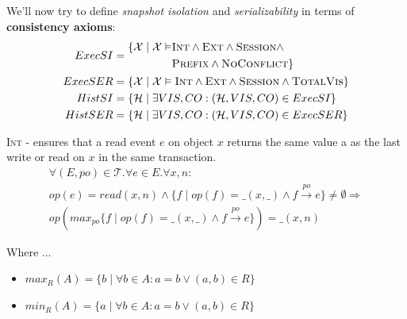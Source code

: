 \documentclass{beamer}
\begin{document}
\begin{frame}
	We'll now try to define \emph{snapshot isolation} and \emph{serializability} in terms of \textbf{consistency axioms}:
	\begin{equation*}
		\begin{aligned}
			ExecSI = {} &
				\begin{aligned} 
					\{ \mathcal{X} \mid \mathcal{X} \vDash & \textsc{Int} \wedge \textsc{Ext} \wedge \textsc{Session} \wedge \\
														& \textsc{Prefix} \wedge \textsc{NoConflict} \}
				\end{aligned}
				\\
			ExecSER = {} & \{ \mathcal{X} \mid \mathcal{X} \vDash \textsc{Int} \wedge \textsc{Ext} \wedge \textsc{Session} \wedge \textsc{TotalVis} \} \\
			HistSI = {} & \{ \mathcal{H} \mid \exists VIS,CO : (\mathcal{H}, VIS, CO) \in ExecSI \} \\
			HistSER = {} & \{ \mathcal{H} \mid \exists VIS,CO : (\mathcal{H}, VIS, CO) \in ExecSER \} 
		\end{aligned}
	\end{equation*}
\end{frame}

\begin{frame}
	\begin{definition}
		\textsc{Int} - ensures that a read event $e$ on object $x$ returns the same value a as the last write or read on $x$ in the same transaction.
		\begin{multline*}
			\forall (E,po)\in \mathcal{T} . \forall e \in E . \forall x,n: \\
				op(e) = read(x,n) \wedge \{f\mid op(f) = \_(x,\_)\wedge f \xrightarrow{po} e\} \ne \emptyset \Rightarrow \\
				op\left(max_{po}\{f \mid op\left(f\right) = \_ \left(x, \_\right) \wedge f \xrightarrow{po} e\}\right) = \_(x,n)
		\end{multline*}
	\end{definition}
	Where ...
	\begin{itemize}
		\item $max_R(A) = \{ b \mid \forall b \in A: a = b \vee (a, b) \in R \} $
		\item $min_R(A) = \{ a \mid \forall b \in A: a = b \vee (a, b) \in R \} $
	\end{itemize}
\end{frame}
\end{document}
